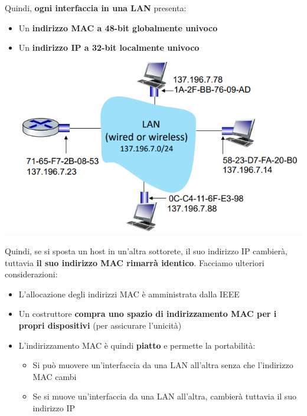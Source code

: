 \documentclass[12pt]{article}
\begin{document}
Quindi, \textbf{ogni interfaccia in una LAN} presenta:
\begin{itemize}
    \item Un \textbf{indirizzo MAC a 48-bit globalmente univoco}
    \item Un \textbf{indirizzo IP a 32-bit localmente univoco}
\end{itemize}
\begin{center}
    \includegraphics[width =0.60\linewidth]{Images/126.png}
\end{center}
Quindi, se si sposta un host in un'altra sottorete, il suo indirizzo IP cambierà, tuttavia \textbf{il suo indirizzo MAC rimarrà identico}.
Facciamo ulteriori considerazioni:
\begin{itemize}
    \item L'allocazione degli indirizzi MAC è amministrata dalla IEEE
    \item Un costruttore \textbf{compra uno spazio di indirizzamento MAC per i propri dispositivi} (per assicurare l'unicità)
    \item L'indirizzamento MAC è quindi \textbf{piatto} e permette la portabilità:
    \begin{itemize}
        \item Si può muovere un'interfaccia da una LAN all'altra senza che l'indirizzo MAC cambi
        \item Se si muove un'interfaccia da una LAN all'altra, cambierà tuttavia il suo indirizzo IP
    \end{itemize}
\end{itemize}
\end{document}
